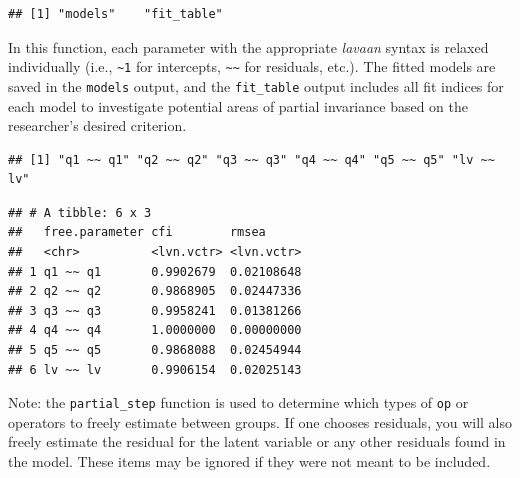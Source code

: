 \documentclass[
  man,floatsintext]{apa7}
\newenvironment{Shaded}{\begin{snugshade}}{\end{snugshade}}
\newcommand{\FunctionTok}[1]{\textcolor[rgb]{0.13,0.29,0.53}{\textbf{#1}}}
\newcommand{\NormalTok}[1]{#1}
\newcommand{\SpecialCharTok}[1]{\textcolor[rgb]{0.81,0.36,0.00}{\textbf{#1}}}
\begin{document}
\normalsize

\begin{verbatim}
## [1] "models"    "fit_table"
\end{verbatim}

In this function, each parameter with the appropriate \emph{lavaan} syntax is relaxed individually (i.e., \texttt{\textasciitilde{}1} for intercepts, \texttt{\textasciitilde{}\textasciitilde{}} for residuals, etc.). The fitted models are saved in the \texttt{models} output, and the \texttt{fit\_table} output includes all fit indices for each model to investigate potential areas of partial invariance based on the researcher's desired criterion.

\small

\begin{Shaded}
\end{Shaded}

\normalsize

\begin{verbatim}
## [1] "q1 ~~ q1" "q2 ~~ q2" "q3 ~~ q3" "q4 ~~ q4" "q5 ~~ q5" "lv ~~ lv"
\end{verbatim}

\small

\begin{Shaded}
\end{Shaded}

\normalsize

\begin{verbatim}
## # A tibble: 6 x 3
##   free.parameter cfi        rmsea     
##   <chr>          <lvn.vctr> <lvn.vctr>
## 1 q1 ~~ q1       0.9902679  0.02108648
## 2 q2 ~~ q2       0.9868905  0.02447336
## 3 q3 ~~ q3       0.9958241  0.01381266
## 4 q4 ~~ q4       1.0000000  0.00000000
## 5 q5 ~~ q5       0.9868088  0.02454944
## 6 lv ~~ lv       0.9906154  0.02025143
\end{verbatim}

Note: the \texttt{partial\_step} function is used to determine which types of \texttt{op} or operators to freely estimate between groups. If one chooses residuals, you will also freely estimate the residual for the latent variable or any other residuals found in the model. These items may be ignored if they were not meant to be included.
\end{document}
